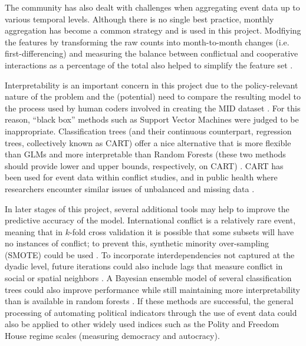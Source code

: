 \documentclass[12pt,letterpaper]{article}
\begin{document}
The community has also dealt with challenges when aggregating event data up to various temporal levels. Although there is no single best practice, monthly aggregation has become a common strategy \citep{arva2013improving,yonamine2013event} and is used in this project. Modfiying the features by transforming the raw counts into month-to-month changes (i.e. first-differencing) and measuring the balance between conflictual and cooperative interactions as a percentage of the total also helped to simplify the feature set \citep{Box:1976}. 


Interpretability is an important concern in this project due to the policy-relevant nature of the problem and the (potential) need to compare the resulting model to the process used by human coders involved in creating the MID dataset \citep{ghosn2004mid3}. For this reason, ``black box'' methods such as Support Vector Machines were judged to be inappropriate. Classification trees (and their continuous counterpart, regression trees, collectively known as CART) offer a nice alternative that is more flexible than GLMs and more interpretable than Random Forests (these two methods should provide lower and upper bounds, respectively, on CART) \citep{klebanov2008lexical}. CART has been used for event data within conflict studies, and in public health where researchers encounter similar issues of unbalanced and missing data \citep{schrodt1990predicting,speybroeck2012classification,trappl1996digging}.

In later stages of this project, several additional tools may help to improve the predictive accuracy of the model. International conflict is a relatively rare event, meaning that in $k$-fold cross validation it is possible that some subsets will have no instances of conflict; to prevent this, synthetic minority over-sampling (SMOTE) could be used \citep{chawla2002smote}. To incorporate interdependencies not captured at the dyadic level, future iterations could also include lags that measure conflict in social or spatial neighbors \citep{gleditsch2000war,gleditsch2001measuring,hoff2004modeling,ward1998democratizing,ward2007disputes,ward2011network}. A Bayesian ensemble model of several classification trees could also improve performance while still maintaining more interpretability than is available in random forests \citep{arva2013improving,montgomery2012improving,Raftery:1995,raftery2005using}. If these methods are successful, the general processing of automating political indicators through the use of event data could also be applied to other widely used indices such as the Polity and Freedom House regime scales (measuring democracy and autocracy). 
\end{document}
